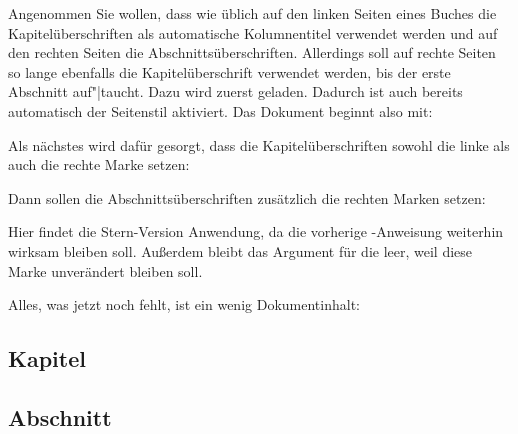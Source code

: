     \begin{Example}
      Angenommen Sie wollen, dass wie üblich auf den linken Seiten eines
      Buches die Kapitelüberschriften als automatische Kolumnentitel verwendet
      werden und auf den rechten Seiten die
      Abschnittsüberschriften. Allerdings soll auf rechte Seiten so lange
      ebenfalls die Kapitelüberschrift verwendet werden, bis der erste
      Abschnitt auf"|taucht. Dazu wird zuerst
       geladen. Dadurch ist auch bereits automatisch der Seitenstil
       aktiviert. Das Dokument
      beginnt also mit:
      Als nächstes wird dafür gesorgt, dass die Kapitelüberschriften sowohl
      die linke als auch die rechte Marke setzen:
\begin{lstcode}
\end{lstcode}
      Dann sollen die Abschnittsüberschriften zusätzlich die rechten Marken
      setzen:
\begin{lstcode}
   \automark*[section]{}
\end{lstcode}
      Hier findet die Stern-Version Anwendung, da die vorherige
      -Anweisung weiterhin wirksam bleiben soll. Außerdem
      bleibt das Argument für die 
      leer, weil diese Marke unverändert bleiben soll.

      Alles, was jetzt noch fehlt, ist ein wenig Dokumentinhalt:
\begin{lstcode}
  \usepackage{lipsum}
  
  \chapter{Kapitel}
  \lipsum[1-20]
  \section{Abschnitt}
  \lipsum[21-40]
  
\end{lstcode}


\end{Example}
